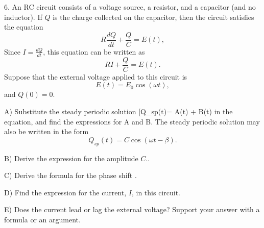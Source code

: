 \documentclass{article}
\begin{document}
6. An RC circuit consists of a voltage source, a resistor, and a capacitor (and no inductor). If $Q$ is the charge collected on the capacitor, then the circuit satisfies the equation
\[R\frac{dQ}{dt} + \frac{Q}{C} = E(t),\]
Since $I = \frac{dQ}{dt}$, this equation can be written as
\[R I + \frac{Q}{C} = E(t).\]
Suppose that the external voltage applied to this circuit is
\[E(t) = E_0 \cos(\omega t),\]
and $Q(0) = 0$.
\vspace{10pt}

A) Substitute the steady periodic solution [Q_{sp}(t)= A\cos(\omega t) + B\sin(\omega t)\] in the equation, and find the expressions for A and B.
The steady periodic solution may also be written in the form
\[Q_{sp}(t) = C\cos(\omega t - \beta).\]

B) Derive the expression for the amplitude $C$..

\vspace{14pt}

C) Derive the formula for the phase shift \beta.

\vspace{14pt}

D) Find the expression for the current, $I$, in this circuit.

\vspace{14pt}

E) Does the current lead or lag the external voltage? Support your answer with a formula or an argument.
\end{document}
